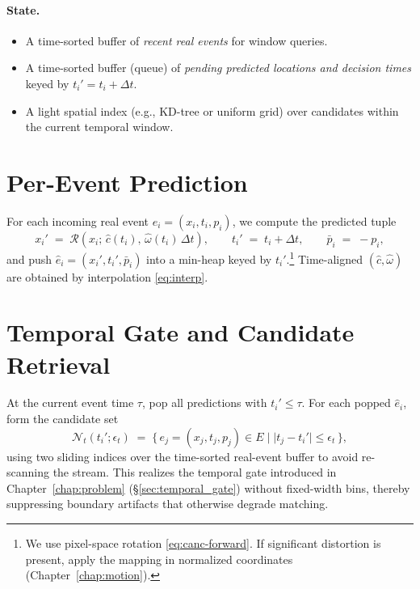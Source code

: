 \paragraph{State.}
\begin{itemize}
    \item A time-sorted buffer of \emph{recent real events} for window queries.
    \item A time-sorted buffer (queue) of \emph{pending predicted locations and decision times} keyed by $t_i'=t_i+\Delta t$.
    \item A light spatial index (e.g., KD-tree or uniform grid) over candidates within the current temporal window.
\end{itemize}

\section{Per-Event Prediction}
For each incoming real event $e_i=(x_i,t_i,p_i)$, we compute the predicted tuple
\begin{equation}
x_i' \;=\; \mathcal{R}\!\left(x_i;\,\hat c(t_i),\,\hat\omega(t_i)\,\Delta t\right),
\qquad
t_i' \;=\; t_i+\Delta t,
\qquad
\bar p_i \;=\; -p_i,
\label{eq:canc-forward}
\end{equation}
and push $\hat e_i=(x_i',t_i',\bar p_i)$ into a min-heap keyed by $t_i'$.\footnote{We use pixel-space rotation \eqref{eq:canc-forward}. If significant distortion is present, apply the mapping in normalized coordinates (Chapter~\ref{chap:motion}).} Time-aligned $(\hat c,\hat\omega)$ are obtained by interpolation \eqref{eq:interp}.

\section{Temporal Gate and Candidate Retrieval}
At the current event time $\tau$, pop all predictions with $t_i' \le \tau$. For each popped $\hat e_i$, form the candidate set
\begin{equation}
\mathcal{N}_t(t_i';\epsilon_t) \;=\; \{\,e_j=(x_j,t_j,p_j)\in E \;|\; |t_j - t_i'| \le \epsilon_t \,\},
\label{eq:true-window}
\end{equation}
using two sliding indices over the time-sorted real-event buffer to avoid re-scanning the stream. This realizes the temporal gate introduced in Chapter~\ref{chap:problem} (\S\ref{sec:temporal_gate}) without fixed-width bins, thereby suppressing boundary artifacts that otherwise degrade matching.

